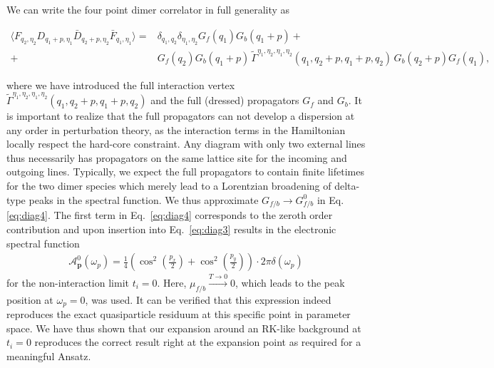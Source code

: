 \documentclass[aps,pra,reprint,showpacs,superscriptaddress]{revtex4-1}
\newcommand\bs[1]{\ensuremath{\boldsymbol{#1}}}
\begin{document}
We can write the four point dimer correlator in full generality as
\begin{widetext}
\begin{align}
\Big\langle F_{q_2,\eta_2}D_{q_1+p,\eta_1}\bar{D}_{q_2+p,\eta_2}\bar{F}_{q_1,\eta_1}\Big\rangle= & \delta_{q_1,q_2}\delta_{\eta_1,\eta_2}G_f(q_1)G_b(q_1+p)+ \label{eq:diag4}\\
+&G_f(q_2)G_b(q_1+p)\, \tilde{\Gamma}^{\eta_1,\eta_2,\eta_1,\eta_2}(q_1,q_2+p,q_1+p,q_2)\, G_b(q_2+p)G_f(q_1), \nonumber
\end{align}
\end{widetext}
where we have introduced the full interaction vertex $\tilde{\Gamma}^{\eta_1,\eta_2,\eta_1,\eta_2}(q_1,q_2+p,q_1+p,q_2)$ and the full (dressed) propagators $G_f$ and $G_b$. It is important to realize that the full propagators can not develop a dispersion at any order in perturbation theory, as the interaction terms in the Hamiltonian locally respect the hard-core constraint. Any diagram with only two external lines thus necessarily has propagators on the same lattice site for the incoming and outgoing lines. Typically, we expect the full propagators to contain finite lifetimes for the two dimer species which merely lead to a Lorentzian broadening of delta-type peaks in the spectral function. We thus approximate $G_{f/b}\rightarrow G_{f/b}^0$ in Eq. \eqref{eq:diag4}. The first term in Eq.~\eqref{eq:diag4} corresponds to the zeroth order contribution and upon insertion into Eq.~\eqref{eq:diag3} results in the electronic spectral function
\begin{align} 
\mathcal{A}_{\bs{p}}^0(\omega_p)=\frac{1}{4}\left(\cos^2 \left(\frac{p_x}{2}\right)+\cos^2\left(\frac{p_y}{2}\right)\right)\cdot 2\pi\delta (\omega_p) \label{eq:diag5}
\end{align}
for the non-interaction limit $t_i=0$. Here, $\mu_{f/b}\xrightarrow{T\rightarrow 0}0$, which leads to the peak position at $\omega_p=0$, was used. It can be verified that this expression indeed reproduces the exact quasiparticle residuum at this specific point in parameter space. We have thus shown that our expansion around an RK-like background at $t_i=0$ reproduces the correct result right at the expansion point as required for a meaningful Ansatz.
\end{document}
